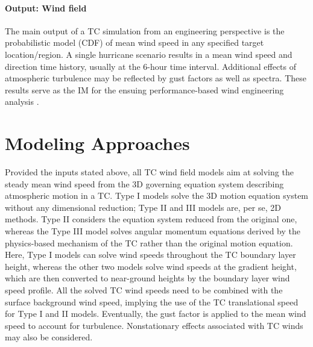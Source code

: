\paragraph{Output: Wind field} The main output of a TC simulation from an engineering perspective is the probabilistic model (CDF) of mean wind speed in any specified target location/region. A single hurricane scenario results in a mean wind speed and direction time history, usually at the 6-hour time interval. Additional effects of atmospheric turbulence may be reflected by gust factors as well as spectra. These results serve as the IM for the ensuing performance-based wind engineering analysis \citep{barbato2013performancebased, chuang2019efficient, liu2014projections, spence2014performancebased, unnikrishnan2016performancebased, xiao2011typhoon, yau2011hurricane}.

\section{Modeling Approaches}
\label{sec:storm_wind_methods}

Provided the inputs stated above, all TC wind field models aim at solving the steady mean wind speed from the 3D governing equation system describing atmospheric motion in a TC. Type I models solve the 3D motion equation system without any dimensional reduction; Type II and III models are, per se, 2D methods. Type II considers the equation system reduced from the original one, whereas the Type III model solves angular momentum equations derived by the physics-based mechanism of the TC rather than the original motion equation. Here, Type I models can solve wind speeds throughout the TC boundary layer height, whereas the other two models solve wind speeds at the gradient height, which are then converted to near-ground heights by the boundary layer wind speed profile. All the solved TC wind speeds need to be combined with the surface background wind speed, implying the use of the TC translational speed for Type I and II models. Eventually, the gust factor is applied to the mean wind speed to account for turbulence. Nonstationary effects associated with TC winds may also be considered.

